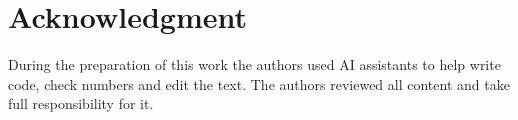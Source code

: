 \documentclass[conference]{IEEEtran}
\begin{document}
\section*{Acknowledgment}
During the preparation of this work the authors used AI assistants to help write code, check numbers and edit the text. The authors reviewed all content and take full responsibility for it.



\end{document}
